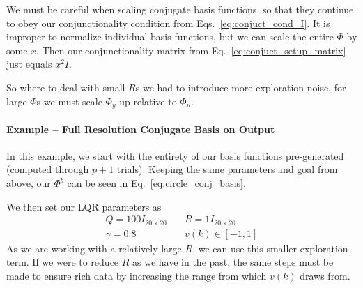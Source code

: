 We must be careful when scaling conjugate basis functions, so that they continue to obey our conjunctionality condition from Eqs.~\ref{eq:conjuct_cond_I}. It is improper to normalize individual basis functions, but we can scale the entire $\Phi$ by some $x$. Then our conjunctionality matrix from Eq.~\ref{eq:conjuct_setup_matrix} just equals $x^2I$.

So where to deal with small $R$s we had to introduce more exploration noise, for large $\Phi$s we must scale $\Phi_y$ up relative to $\Phi_u$.

\FloatBarrier\paragraph{Example -- Full Resolution Conjugate Basis on Output}
In this example, we start with the entirety of our basis functions pre-generated (computed through $p+1$ trials). Keeping the same parameters and goal from above, our $\Phi^b$ can be seen in Eq.~\ref{eq:circle_conj_basis}.

We then set our LQR parameters as
\begin{equation}
    \begin{split}
        Q = 100I_{20 \times 20}
        &\quad
        R = 1I_{20 \times 20}   \\
        \gamma = 0.8
        &\quad
        v(k) \in \left[-1, 1\right]
    \end{split}
\end{equation}
As we are working with a relatively large $R$, we can use this smaller exploration term. If we were to reduce $R$ as we have in the past, the same steps must be made to ensure rich data by increasing the range from which $v(k)$ draws from.


